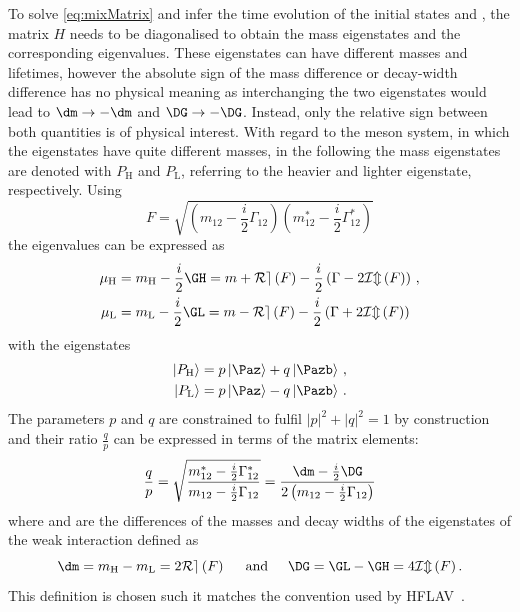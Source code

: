 To solve \cref{eq:mixMatrix} and infer the time evolution of the initial states \Paz and \Pazb, the matrix $H$ needs to be diagonalised to obtain the mass eigenstates and the corresponding eigenvalues.
These eigenstates can have different masses and lifetimes, however the absolute sign of the mass difference \dm or decay-width difference \DG has no physical meaning as interchanging the two eigenstates would lead to $\dm\to-\dm$ and $\DG\to-\DG$.
Instead, only the relative sign between both quantities is of physical interest.
With regard to the \Bz meson system, in which the eigenstates have quite different masses, in the following the mass eigenstates are denoted with $P_\text{H}$ and $P_\text{L}$, referring to the heavier and lighter eigenstate, respectively.
Using
\begin{equation}
F=\sqrt{\left(m_{12}-\frac{i}{2}\Gamma_{12}\right)\left(m_{12}^\ast-\frac{i}{2}\Gamma_{12}^\ast\right)}
\end{equation}
the eigenvalues can be expressed as
\begin{equation}
\begin{split}
\mu_\text{H} &= m_\text{H}-\frac{i}{2}\GH = m + \mathcal{Re}\left(F\right)-\frac{i}{2}\left(\Gamma-2\mathcal{Im}\left(F\right)\right)\,,\\
\mu_\text{L} &= m_\text{L}-\frac{i}{2}\GL = m - \mathcal{Re}\left(F\right)-\frac{i}{2}\left(\Gamma+2\mathcal{Im}\left(F\right)\right)\label{eq:Mass_eigenvalues}
\end{split}
\end{equation}
with the eigenstates
\begin{equation}
\begin{split}
\left|P_\text{H}\right>&= p\left|\Paz\right>+q\left|\Pazb\right>\,,\\
\left|P_\text{L}\right>&= p\left|\Paz\right>-q\left|\Pazb\right>\,.\label{eq:Mass_eigenstates}
\end{split}
\end{equation}
The parameters $p$ and $q$ are constrained to fulfil $\left|p\right|^2\!+\left|q\right|^2=1$ by construction and their ratio $\frac{q}{p}$ can be expressed in terms of the matrix elements:
\begin{equation}
\frac{q}{p}=\sqrt{ \frac{ m_{12}^\ast-\frac{i}{2}\Gamma_{12}^\ast }{ m_{12}-\frac{i}{2}\Gamma_{12} }}
=\frac{\dm-\frac{i}{2}\DG}{2\left(m_{12}-\frac{i}{2}\Gamma_{12}\right)}\label{eq:qoverp}
\end{equation}
where \dm and \DG are the differences of the masses and decay widths of the eigenstates of the weak interaction defined as
\begin{equation}
\dm=m_\text{H}-m_\text{L}=2\mathcal{Re}\left(F\right)\hspace{0.5cm}\text{and}\hspace{0.5cm}\DG=\GL-\GH=4\mathcal{Im}\left(F\right).\label{eq:define_dmAndDG}
\end{equation}
This definition is chosen such it matches the convention used by \ac{HFLAV}~\cite{HFLAV2016}.

